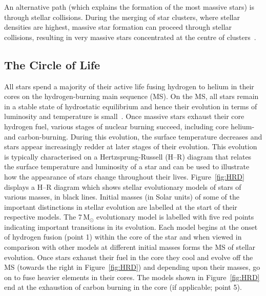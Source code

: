 An alternative path (which explains the formation of the most massive stars) is through stellar collisions.
During the merging of star clusters, where stellar densities are highest, massive star formation can proceed through stellar collisions, resulting in very massive stars concentrated at the centre of clusters~\citep{Fujii13}.



\subsection{The Circle of Life} %
\label{sub:life_cycle}

All stars spend a majority of their active life fusing hydrogen to helium in their cores on the hydrogen-burning main sequence (MS).
On the MS, all stars remain in a stable state of hydrostatic equilibrium and hence their evolution in terms of luminosity and temperature is small~\citep{2012sse..book.....K}.
Once massive stars exhaust their core hydrogen fuel, various stages of nuclear burning succeed, including core helium- and carbon-burning.
During this evolution, the surface temperature decreases and stars appear increasingly redder at later stages of their evolution.
This evolution is typically characterised on a Hertzsprung-Russell (H--R) diagram that relates the surface temperature and luminosity of a star and can be used to illustrate how the appearance of stars change throughout their lives.
Figure~\ref{fig:HRD} displays a H--R diagram which shows stellar evolutionary models of stars of various masses, in black lines.
Initial masses (in Solar units) of some of the important distinctions in stellar evolution are labelled at the start of their respective models.
The 7\,M$_{\odot}$ evolutionary model is labelled with five red points indicating important transitions in its evolution.
Each model begins at the onset of hydrogen fusion (point 1) within the core of the star and when viewed in comparison with other models at different initial masses forms the MS of stellar evolution.
Once stars exhaust their fuel in the core they cool and evolve off the MS (towards the right in Figure~\ref{fig:HRD}) and depending upon their masses, go on to fuse heavier elements in their cores.
The models shown in Figure~\ref{fig:HRD} end at the exhaustion of carbon burning in the core (if applicable; point 5).


